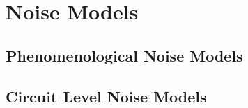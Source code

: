 \chapter{Noise Models}\label{ch:noise-models}
\section{Phenomenological Noise Models}\label{}
\lipsum[1]
\section{Circuit Level Noise Models}
\lipsum[5]

